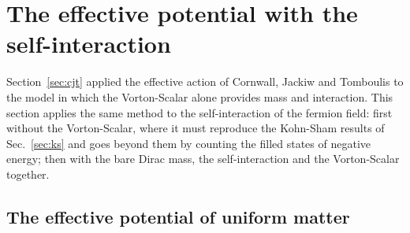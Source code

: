 \section{The effective potential with the self-interaction}
\label{sec:cjtcontact}

Section~\ref{sec:cjt} applied the effective action of Cornwall, Jackiw and Tomboulis to the model
in which the Vorton-Scalar alone provides mass and interaction. This section applies the same
method to the self-interaction of the fermion field: first without the Vorton-Scalar, where it must
reproduce the Kohn-Sham results of Sec.~\ref{sec:ks} and goes beyond them by counting the filled
states of negative energy; then with the bare Dirac mass, the self-interaction and the Vorton-Scalar
together.

\subsection{The effective potential of uniform matter}

